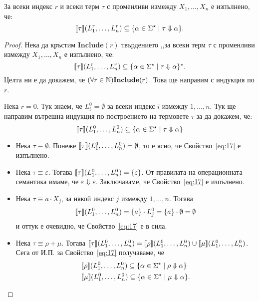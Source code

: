 \begin{lemma}
  За всеки индекс $r$ и всеки терм $\tau$ с променливи измежду $X_1,\dots,X_n$ е изпълнено, че:
  \[\llbracket{\tau}\rrbracket(L^r_1,\dots,L^r_n) \subseteq \{\alpha \in \Sigma^\star \mid \tau \Downarrow \alpha\}.\]
\end{lemma}
\begin{proof}
  Нека да кръстим $\textbf{Include}(r)$ твърдението
  ,,за всеки терм $\tau$ с променливи измежду $X_1,\dots,X_n$ е изпълнено, че:
  \[\llbracket{\tau}\rrbracket(L^r_1,\dots,L^r_n) \subseteq \{\alpha \in \Sigma^\star \mid \tau \Downarrow \alpha\}".\]
  Целта ни е да докажем, че $(\forall r\in\mathbb{N})\textbf{Include}(r)$. Това ще направим с индукция по $r$.
  
  Нека $r = 0$. Тук знаем, че $L^0_i = \emptyset$ за всеки индекс $i$ измежду $1,\dots,n$. Тук ще направим вътрешна индукция по построението на термовете $\tau$ за да докажем, че:
  \begin{equation}
    \label{eq:17}
    \llbracket{\tau}\rrbracket(L^0_1,\dots,L^0_n) \subseteq \{\alpha \in \Sigma^\star \mid \tau \Downarrow \alpha\}
  \end{equation}
  \begin{itemize}
  \item
    Нека $\tau \equiv \emptyset$. Понеже $\llbracket{\tau}\rrbracket(L^0_1,\dots,L^0_n) = \emptyset$, то е ясно, че Свойство~\ref{eq:17} е изпълнено.
  \item
    Нека $\tau \equiv \varepsilon$. Тогава $\llbracket{\tau}\rrbracket(L^0_1,\dots,L^0_n) = \{\varepsilon\}$.
    От правилата на операционната семантика имаме, че $\varepsilon \Downarrow \varepsilon$.
    Заключаваме, че Свойство~\ref{eq:17} е изпълнено.
  \item
    Нека $\tau \equiv a \cdot X_j$, за някой индекс $j$ измежду $1,\dots,n$. Тогава
    \[\llbracket{\tau}\rrbracket(L^0_1,\dots,L^0_n) = \{a\}\cdot L^0_j = \{a\} \cdot \emptyset = \emptyset\]
    и оттук е очевидно, че Свойство~\ref{eq:17} е в сила.
  \item
    Нека $\tau \equiv \rho + \mu$. Тогава $\llbracket{\tau}\rrbracket(L^0_1,\dots,L^0_n) = \llbracket{\rho}\rrbracket(L^0_1,\dots,L^0_n) \cup \llbracket{\mu}\rrbracket(L^0_1,\dots,L^0_n)$. Сега от И.П. за Свойство~\ref{eq:17} получаваме, че
    \begin{align*}
      & \val{\rho}(L^0_1,\dots,L^0_n) \subseteq \{\alpha \in \Sigma^\star \mid \rho \Downarrow \alpha\}\\
      & \val{\mu}(L^0_1,\dots,L^0_n) \subseteq \{\alpha \in \Sigma^\star \mid \mu \Downarrow \alpha\}.

\end{align*}
\end{itemize}
\end{proof}

